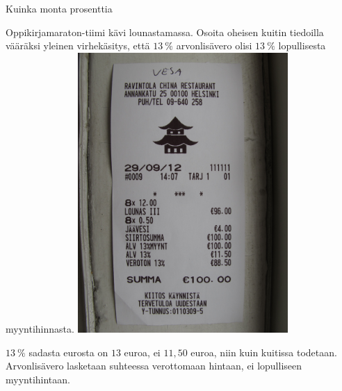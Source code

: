 \begin{tehtavasivu}
\begin{tehtava}
    Kuinka monta prosenttia
    \begin{alakohdat}
    \end{alakohdat}
    \begin{vastaus}
	  \begin{alakohdat}
	  \end{alakohdat}
    \end{vastaus}
\end{tehtava}

\begin{tehtava}
    Oppikirjamaraton-tiimi kävi lounastamassa. Osoita oheisen kuitin tiedoilla vääräksi yleinen virhekäsitys,
    että $13~\%$ arvonlisävero olisi $13~\%$ lopullisesta myyntihinnasta.
    \includegraphics[width=80mm, angle=270]{pictures/alv-kuitti}
    \begin{vastaus}
         $13~\%$ sadasta eurosta on $13$ euroa, ei $11,50$ euroa, niin kuin kuitissa todetaan. Arvonlisävero
         lasketaan suhteessa verottomaan hintaan, ei lopulliseen myyntihintaan.
    \end{vastaus}
\end{tehtava}


\end{tehtavasivu}
